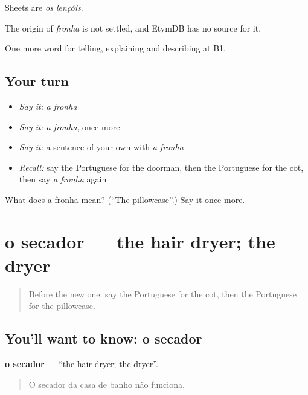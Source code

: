 Sheets are \emph{os lençóis}.

\begin{cousinweb}
The origin of \emph{fronha} is not settled, and EtymDB has no source for it.
\end{cousinweb}

\begin{grammarlens}[title={What you've built}]
One more word for telling, explaining and describing at B1.
\end{grammarlens}

\subsection*{Your turn}
\begin{itemize}
\raggedright
  \item \emph{Say it:} \emph{a fronha}
  \item \emph{Say it:} \emph{a fronha}, once more
  \item \emph{Say it:} a sentence of your own with \emph{a fronha}
  \item \emph{Recall:} say the Portuguese for the doorman, then the Portuguese for the cot, then say \emph{a fronha} again
\end{itemize}

\begin{tcolorbox}[breakable,colback=teal!4,colframe=teal!35!black,title={Before you move on}]
What does a fronha mean? (\textquotedblleft{}The pillowcase\textquotedblright{}.) Say it once more.
\end{tcolorbox}
\section[o secador]{o secador — the hair dryer; the dryer}

\label{lesson:PT-C429-secador}



\begin{quote}
Before the new one: say the Portuguese for the cot, then the Portuguese for the pillowcase.
\end{quote}

\subsection*{You'll want to know: o secador}
\textbf{o secador} — \textquotedblleft{}the hair dryer; the dryer\textquotedblright{}.

\begin{quote}
O secador da casa de banho não funciona.
\end{quote}

